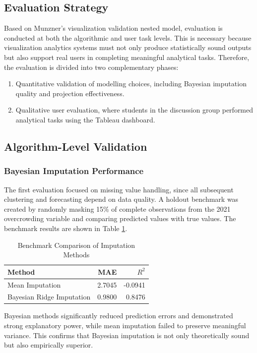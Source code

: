 \documentclass[conference]{IEEEtran}
\begin{document}
\subsection{Evaluation Strategy}
Based on Munzner's visualization validation nested model, evaluation is conducted at both the algorithmic and user task levels. This is necessary because visualization analytics systems must not only produce statistically sound outputs but also support real users in completing meaningful analytical tasks. Therefore, the evaluation is divided into two complementary phases:
\begin{enumerate}
    \item Quantitative validation of modelling choices, including Bayesian imputation quality and projection effectiveness.
    \item Qualitative user evaluation, where students in the discussion group performed analytical tasks using the Tableau dashboard.
\end{enumerate}

\subsection{Algorithm-Level Validation}

\subsubsection{Bayesian Imputation Performance}
The first evaluation focused on missing value handling, since all subsequent clustering and forecasting depend on data quality. A holdout benchmark was created by randomly masking 15\% of complete observations from the 2021 overcrowding variable and comparing predicted values with true values. The benchmark results are shown in Table \ref{tab:imputation_eval}.

\begin{table}[htbp]
\centering
\caption{Benchmark Comparison of Imputation Methods}
\label{tab:imputation_eval}
\begin{tabular}{@{}lrr@{}}
\toprule
\textbf{Method} & \textbf{MAE} & \textbf{$R^2$} \\ \midrule
Mean Imputation & 2.7045 & -0.0941 \\
Bayesian Ridge Imputation & 0.9800 & 0.8476 \\ \bottomrule
\end{tabular}
\end{table}

Bayesian methods significantly reduced prediction errors and demonstrated strong explanatory power, while mean imputation failed to preserve meaningful variance. This confirms that Bayesian imputation is not only theoretically sound but also empirically superior.
\end{document}
